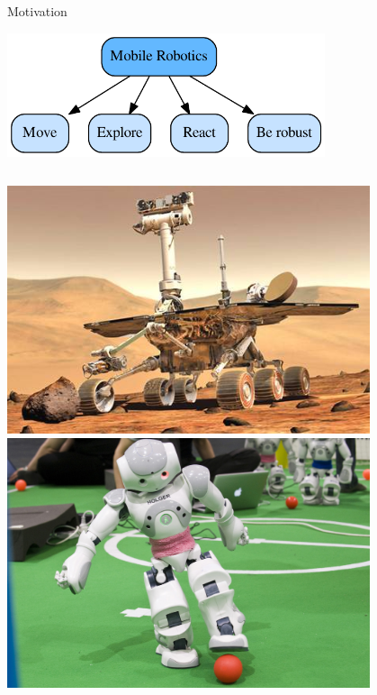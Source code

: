 \documentclass{beamer}
\begin{document}
\begin{frame}{Motivation}
\begin{center}
\includegraphics[width=0.7\textwidth]{dot/mobile.pdf}\\
\end{center}
\begin{columns}
\centering
\includegraphics[width=0.8\textwidth]{img/mars-rover.jpg}\\
\centering
\includegraphics[width=0.8\textwidth]{img/football.jpg}\\
\end{columns}
\end{frame}
\end{document}
